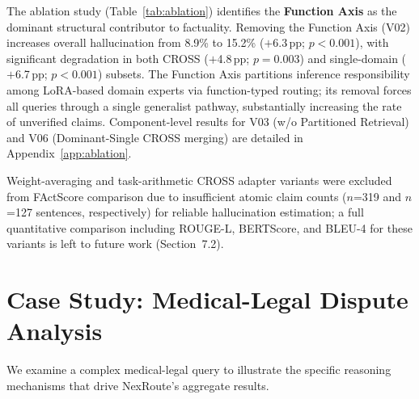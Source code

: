 \documentclass[a4paper,fleql]{cas-sc}
\begin{document}
The ablation study (Table~\ref{tab:ablation}) identifies the
\textbf{Function Axis} as the dominant structural contributor to factuality.
Removing the Function Axis (V02) increases overall hallucination from 8.9\%
to 15.2\% ($+$6.3\,pp; $p{<}0.001$), with significant degradation in both
CROSS ($+$4.8\,pp; $p{=}0.003$) and single-domain ($+$6.7\,pp; $p{<}0.001$)
subsets.
The Function Axis partitions inference responsibility among LoRA-based domain
experts via function-typed routing; its removal forces all queries through a
single generalist pathway, substantially increasing the rate of unverified
claims.
Component-level results for V03 (w/o Partitioned Retrieval) and V06
(Dominant-Single CROSS merging) are detailed in Appendix~\ref{app:ablation}.

Weight-averaging and task-arithmetic CROSS adapter variants were excluded from FActScore comparison due to insufficient atomic claim counts ($n$=319 and $n$=127 sentences, respectively) for reliable hallucination estimation; a full quantitative comparison including ROUGE-L, BERTScore, and BLEU-4 for these variants is left to future work (Section~7.2).

\section{Case Study: Medical-Legal Dispute Analysis}
\label{sec:casestudy}
We examine a complex medical-legal query to illustrate the specific reasoning mechanisms that drive NexRoute's aggregate results.

\end{document}
